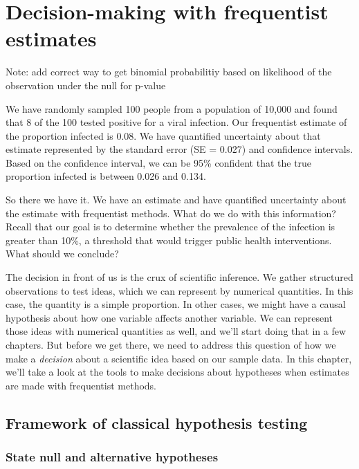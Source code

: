 \documentclass[
]{book}
\begin{document}
\chapter{Decision-making with frequentist estimates}\label{decision-making-with-frequentist-estimates}

Note: add correct way to get binomial probabilitiy based on likelihood of the observation under the null for p-value

We have randomly sampled 100 people from a population of 10,000 and found that 8 of the 100 tested positive for a viral infection. Our frequentist estimate of the proportion infected is 0.08. We have quantified uncertainty about that estimate represented by the standard error (SE = 0.027) and confidence intervals. Based on the confidence interval, we can be 95\% confident that the true proportion infected is between 0.026 and 0.134.

So there we have it. We have an estimate and have quantified uncertainty about the estimate with frequentist methods. What do we do with this information? Recall that our goal is to determine whether the prevalence of the infection is greater than 10\%, a threshold that would trigger public health interventions. What should we conclude?

The decision in front of us is the crux of scientific inference. We gather structured observations to test ideas, which we can represent by numerical quantities. In this case, the quantity is a simple proportion. In other cases, we might have a causal hypothesis about how one variable affects another variable. We can represent those ideas with numerical quantities as well, and we'll start doing that in a few chapters. But before we get there, we need to address this question of how we make a \emph{decision} about a scientific idea based on our sample data. In this chapter, we'll take a look at the tools to make decisions about hypotheses when estimates are made with frequentist methods.

\section{Framework of classical hypothesis testing}\label{framework-of-classical-hypothesis-testing}

\subsection{State null and alternative hypotheses}\label{state-null-and-alternative-hypotheses}
\end{document}
